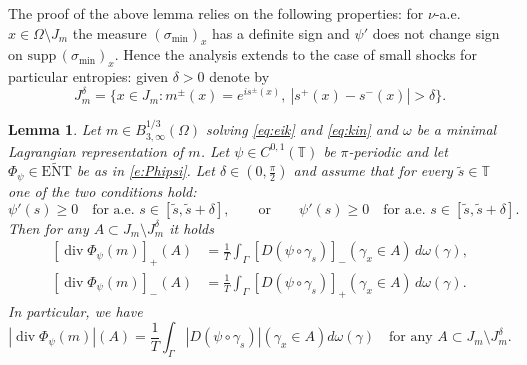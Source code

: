 \documentclass[fleqn
]{article}
\numberwithin{equation}{section}
\newcommand{\T}{{\mathbb T}}
\DeclareMathOperator{\dv}{div}
\newtheorem{lem}[thm]{Lemma}
\theoremstyle{definition}
\begin{document}
The proof of the above lemma relies on the following properties: for $\nu$-a.e. $x \in \Omega \setminus J_m$  the measure $(\sigma_{\min})_x$ has a definite sign and $\psi'$ does not change sign on $\mathrm{supp}\, (\sigma_{\min})_x$.
%
Hence the analysis extends to the case of small shocks for particular entropies:
given $\delta>0$ denote by
\begin{equation}\label{e:Jmdelta}
J_m^\delta = \{x \in J_m : m^\pm(x)=e^{is^\pm(x)}, \ |s^+(x)-s^-(x)|> \delta \}.
\end{equation}
\begin{lem}\label{l:pos-neg-jumps}
Let $m \in B^{1/3}_{3,\infty}(\Omega)$ solving \eqref{eq:eik} and \eqref{eq:kin} and $\omega$ be a minimal Lagrangian representation of $m$.
Let $\psi \in C^{0,1}(\T)$ be $\pi$-periodic and let $\Phi_\psi \in \widetilde{\mathrm{ENT}}$ be as in \eqref{e:Phipsi}. Let $\delta \in \left(0, \frac\pi2\right)$ and assume that for every $\tilde s \in \T$ one of the two conditions hold:
\[
\psi'(s)\ge 0 \quad \mbox{for a.e. } s \in [\tilde s, \tilde s + \delta], \qquad \mbox{or} \qquad \psi'(s)\ge 0 \quad  \mbox{for a.e. }  s \in [\tilde s, \tilde s + \delta].
\]
Then for any  $A \subset J_m \setminus J_m^\delta$ it holds
\[
\begin{split}
[\dv \Phi_\psi (m)]_+ (A) & = \frac1T \int_\Gamma [D(\psi \circ \gamma_s)]_- (\gamma_x \in A) \, d\omega (\gamma),\\
[\dv \Phi_\psi (m)]_- (A) & = \frac1T \int_\Gamma [D(\psi \circ \gamma_s)]_+ (\gamma_x \in A) \, d\omega (\gamma).
\end{split}
\]
In particular, we have
\[
|\dv \Phi_\psi (m)| (A) = \frac1T \int_\Gamma |D(\psi \circ \gamma_s)| (\gamma_x \in A) d\omega (\gamma) \quad \mbox{for any } A \subset J_m \setminus J_m^\delta.
\]
\end{lem}
%
\end{document}
